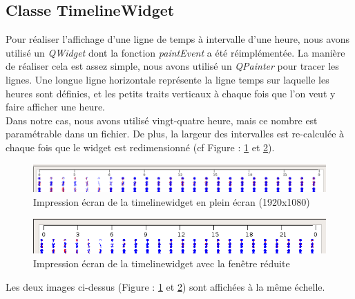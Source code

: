 \documentclass[12pt]{article}
\begin{document}
		\subsection{Classe TimelineWidget}
		Pour réaliser l’affichage d’une ligne de temps à intervalle d’une heure, nous avons utilisé un \textit{QWidget} dont la fonction \textit{paintEvent} a été réimplémentée. La manière de réaliser cela est assez simple, nous avons utilisé un \textit{QPainter} pour tracer les lignes. Une longue ligne horizontale représente la ligne temps sur laquelle les heures sont définies, et les petits traits verticaux à chaque fois que l’on veut y faire afficher une heure.\\
Dans notre cas, nous avons utilisé vingt-quatre heure, mais ce nombre est paramétrable dans un fichier. De plus, la largeur des intervalles est re-calculée à chaque fois que le widget est redimensionné
(cf Figure : \ref{fig:timeline_widget_1} et \ref{fig:timeline_widget_2}).


\clearpage
		\begin{figure}[!h]
		\begin{center}
		\includegraphics[scale=.4]{timeline_widget_1.png}
		\caption{Impression écran de la timelinewidget en plein écran (1920x1080)}
		\label{fig:timeline_widget_1}
		\end{center}
		\end{figure}
		
		\begin{figure}[!h]
		\begin{center}
		\includegraphics[scale=.4]{timeline_widget_2.png}
		\caption{Impression écran de la timelinewidget avec la fenêtre réduite}
		\label{fig:timeline_widget_2}
		\end{center}
		\end{figure}
		
		Les deux images ci-dessus (Figure : \ref{fig:timeline_widget_1} et \ref{fig:timeline_widget_2})
		sont affichées à la même échelle.
	
		
\end{document}
